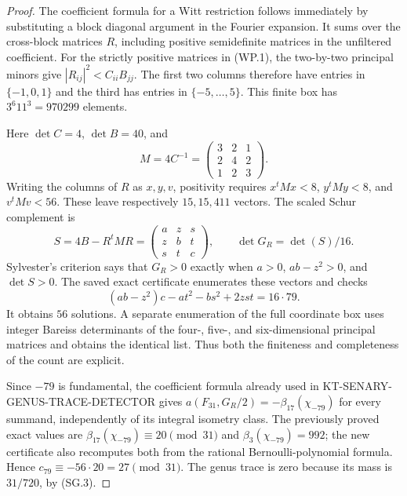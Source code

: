 \begin{proof}
The coefficient formula for a Witt restriction follows immediately by
substituting a block diagonal argument in the Fourier expansion.  It sums
over the cross-block matrices $R$, including positive semidefinite matrices
in the unfiltered coefficient.  For the strictly positive matrices in
(WP.1), the two-by-two principal minors give
$|R_{ij}|^2<C_{ii}B_{jj}$.  The first two columns therefore have entries
in $\{-1,0,1\}$ and the third has entries in $\{-5,\ldots,5\}$.
This finite box has $3^6 11^3=970299$ elements.

Here $\det C=4$, $\det B=40$, and
\[
 M=4C^{-1}=\begin{pmatrix}3&2&1\\2&4&2\\1&2&3\end{pmatrix}.
\]
Writing the columns of $R$ as $x,y,v$, positivity requires
$x^tMx<8$, $y^tMy<8$, and $v^tMv<56$.  These leave respectively
$15,15,411$ vectors.  The scaled Schur complement is
\[
 S=4B-R^tMR=\begin{pmatrix}a&z&s\\z&b&t\\s&t&c\end{pmatrix},
 \qquad \det G_R=\det(S)/16.
\]
Sylvester's criterion says that $G_R>0$ exactly when
$a>0$, $ab-z^2>0$, and $\det S>0$.  The saved exact certificate enumerates
these vectors and checks
\[
 (ab-z^2)c-at^2-bs^2+2zst=16\cdot79.
\]
It obtains $56$ solutions.  A separate enumeration of the full coordinate
box uses integer Bareiss determinants of the four-, five-, and six-dimensional
principal matrices and obtains the identical list.  Thus both the finiteness
and completeness of the count are explicit.

Since $-79$ is fundamental, the coefficient formula already used in
KT-SENARY-GENUS-TRACE-DETECTOR gives
$a(F_{31},G_R/2)=-\beta_{17}(\chi_{-79})$ for every summand, independently
of its integral isometry class.  The previously proved exact values are
$\beta_{17}(\chi_{-79})\equiv20\pmod{31}$ and
$\beta_3(\chi_{-79})=992$; the new certificate also recomputes both
from the rational Bernoulli-polynomial formula.  Hence
$c_{79}\equiv-56\cdot20=27\pmod{31}$.
The genus trace is zero because its mass is $31/720$, by (SG.3).
\end{proof}

